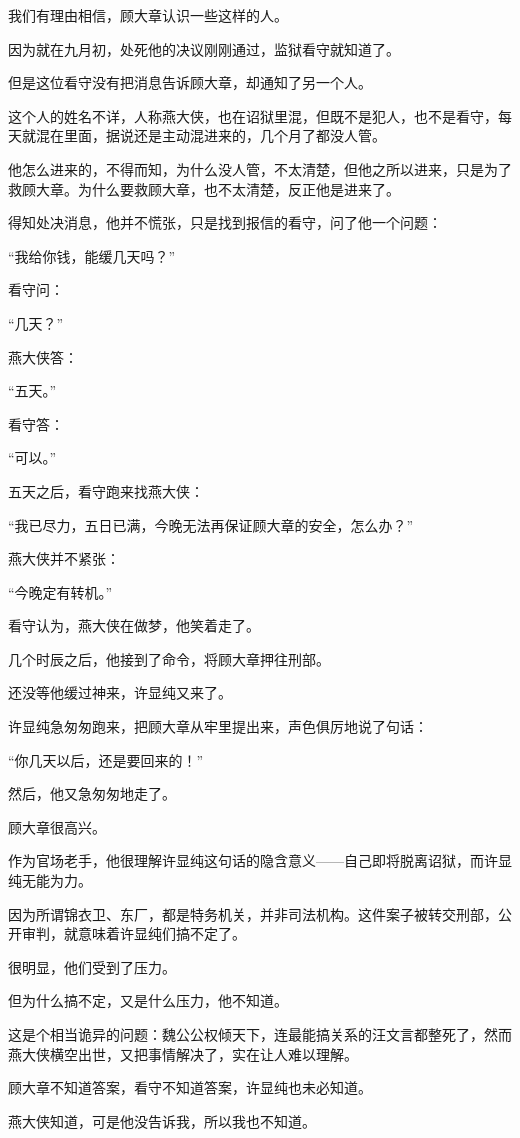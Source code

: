 \begin{multicols}{\theparacolNo}
我们有理由相信，顾大章认识一些这样的人。

因为就在九月初，处死他的决议刚刚通过，监狱看守就知道了。

但是这位看守没有把消息告诉顾大章，却通知了另一个人。

这个人的姓名不详，人称燕大侠，也在诏狱里混，但既不是犯人，也不是看守，每天就混在里面，据说还是主动混进来的，几个月了都没人管。

他怎么进来的，不得而知，为什么没人管，不太清楚，但他之所以进来，只是为了救顾大章。为什么要救顾大章，也不太清楚，反正他是进来了。

得知处决消息，他并不慌张，只是找到报信的看守，问了他一个问题：

“我给你钱，能缓几天吗？”

看守问：

“几天？”

燕大侠答：

“五天。”

看守答：

“可以。”

五天之后，看守跑来找燕大侠：

“我已尽力，五日已满，今晚无法再保证顾大章的安全，怎么办？”

燕大侠并不紧张：

“今晚定有转机。”

看守认为，燕大侠在做梦，他笑着走了。

几个时辰之后，他接到了命令，将顾大章押往刑部。

还没等他缓过神来，许显纯又来了。

许显纯急匆匆跑来，把顾大章从牢里提出来，声色俱厉地说了句话：

“你几天以后，还是要回来的！”

然后，他又急匆匆地走了。

顾大章很高兴。

作为官场老手，他很理解许显纯这句话的隐含意义——自己即将脱离诏狱，而许显纯无能为力。

因为所谓锦衣卫、东厂，都是特务机关，并非司法机构。这件案子被转交刑部，公开审判，就意味着许显纯们搞不定了。

很明显，他们受到了压力。

但为什么搞不定，又是什么压力，他不知道。

这是个相当诡异的问题：魏公公权倾天下，连最能搞关系的汪文言都整死了，然而燕大侠横空出世，又把事情解决了，实在让人难以理解。

顾大章不知道答案，看守不知道答案，许显纯也未必知道。

燕大侠知道，可是他没告诉我，所以我也不知道。


\end{multicols}
